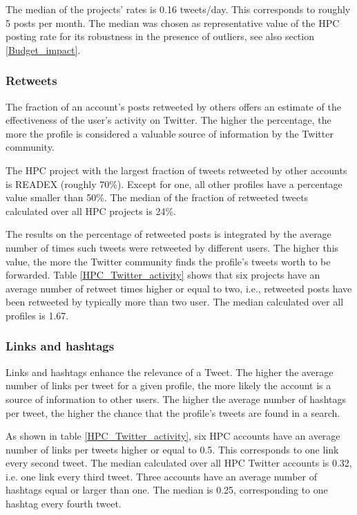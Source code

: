 The median of the projects' rates is 0.16 tweets/day. This corresponds to roughly 5 posts per month. The median was chosen as representative value of the HPC posting rate for its robustness in the presence of outliers, see also section \ref{Budget_impact}.

\subsubsection{Retweets}
The fraction of an account's posts retweeted by others offers an estimate of the effectiveness of the user's  activity on Twitter. The higher the percentage, the more the profile is considered a valuable source of information by the Twitter community. 

The HPC project with the largest fraction of tweets retweeted by other accounts is READEX (roughly 70\%). Except for one, all other profiles have a percentage value smaller than 50\%. The median of the fraction of retweeted tweets calculated over all HPC projects is 24\%.

The results on the percentage of retweeted posts is integrated by the average number of times such tweets were retweeted by different users. The higher this value, the more the Twitter community finds the profile's tweets worth to be forwarded. Table \ref{HPC_Twitter_activity} shows that six projects have an average number of retweet times higher or equal to two, i.e., retweeted posts have been retweeted by typically more than two user. The median calculated over all profiles is 1.67.

\subsubsection{Links and hashtags}
Links and hashtags enhance the relevance of a Tweet. The higher the average number of links per tweet for a given profile, the more likely the account is a source of information to other users. The higher the average number of hashtags per tweet, the higher the chance that the profile's tweets are found in a search.

As shown in table \ref{HPC_Twitter_activity}, six HPC accounts have an average number of links per tweets higher or equal to 0.5. This corresponds to one link every second tweet. The median calculated over all HPC Twitter accounts is 0.32, i.e. one link every third tweet. Three accounts have an average number of hashtags equal or larger than one. The median is 0.25, corresponding to one hashtag every fourth tweet.

